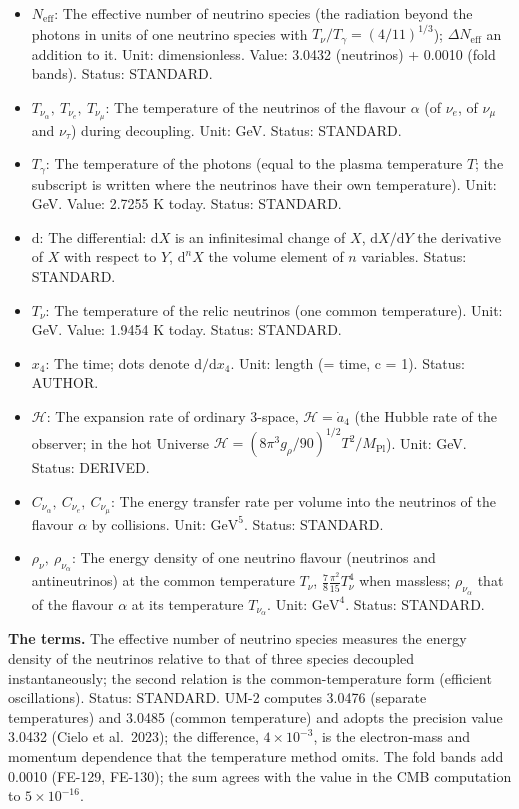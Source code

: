 \documentclass[
  10pt,
]{article}
\providecommand{\tightlist}{%
  \setlength{\itemsep}{0pt}\setlength{\parskip}{0pt}}
\begin{document}
\begin{itemize}
\tightlist
\item
  \(N_{\mathrm{eff}}\): The effective number of neutrino species (the
  radiation beyond the photons in units of one neutrino species with
  \(T_\nu/T_\gamma = (4/11)^{1/3}\)); \(\Delta N_{\mathrm{eff}}\) an
  addition to it. Unit: dimensionless. Value: 3.0432 (neutrinos) +
  0.0010 (fold bands). Status: STANDARD.
\item
  \(T_{\nu_\alpha},\ T_{\nu_e},\ T_{\nu_\mu}\): The temperature of the
  neutrinos of the flavour \(\alpha\) (of \(\nu_e\), of \(\nu_\mu\) and
  \(\nu_\tau\)) during decoupling. Unit: GeV. Status: STANDARD.
\item
  \(T_\gamma\): The temperature of the photons (equal to the plasma
  temperature \(T\); the subscript is written where the neutrinos have
  their own temperature). Unit: GeV. Value: 2.7255 K today. Status:
  STANDARD.
\item
  \(\mathrm{d}\): The differential: \(\mathrm{d}X\) is an infinitesimal
  change of \(X\), \(\mathrm{d}X/\mathrm{d}Y\) the derivative of \(X\)
  with respect to \(Y\), \(\mathrm{d}^nX\) the volume element of \(n\)
  variables. Status: STANDARD.
\item
  \(T_\nu\): The temperature of the relic neutrinos (one common
  temperature). Unit: GeV. Value: 1.9454 K today. Status: STANDARD.
\item
  \(x_4\): The time; dots denote \(\mathrm{d}/\mathrm{d}x_4\). Unit:
  length (= time, c = 1). Status: AUTHOR.
\item
  \(\mathcal{H}\): The expansion rate of ordinary 3-space,
  \(\mathcal{H} = \dot a_4\) (the Hubble rate of the observer; in the
  hot Universe
  \(\mathcal{H} = (8\pi^3g_\rho/90)^{1/2}T^2/M_{\mathrm{Pl}}\)). Unit:
  GeV. Status: DERIVED.
\item
  \(C_{\nu_\alpha},\ C_{\nu_e},\ C_{\nu_\mu}\): The energy transfer rate
  per volume into the neutrinos of the flavour \(\alpha\) by collisions.
  Unit: \(\mathrm{GeV}^{5}\). Status: STANDARD.
\item
  \(\rho_\nu,\ \rho_{\nu_\alpha}\): The energy density of one neutrino
  flavour (neutrinos and antineutrinos) at the common temperature
  \(T_\nu\), \(\frac78\frac{\pi^2}{15}T_\nu^4\) when massless;
  \(\rho_{\nu_\alpha}\) that of the flavour \(\alpha\) at its
  temperature \(T_{\nu_\alpha}\). Unit: \(\mathrm{GeV}^{4}\). Status:
  STANDARD.
\end{itemize}

\textbf{The terms.} The effective number of neutrino species measures
the energy density of the neutrinos relative to that of three species
decoupled instantaneously; the second relation is the common-temperature
form (efficient oscillations). Status: STANDARD. UM-2 computes 3.0476
(separate temperatures) and 3.0485 (common temperature) and adopts the
precision value 3.0432 (Cielo et al.~2023); the difference,
\(4\times10^{-3}\), is the electron-mass and momentum dependence that
the temperature method omits. The fold bands add 0.0010 (FE-129,
FE-130); the sum agrees with the value in the CMB computation to
\(5\times10^{-16}\).
\end{document}

